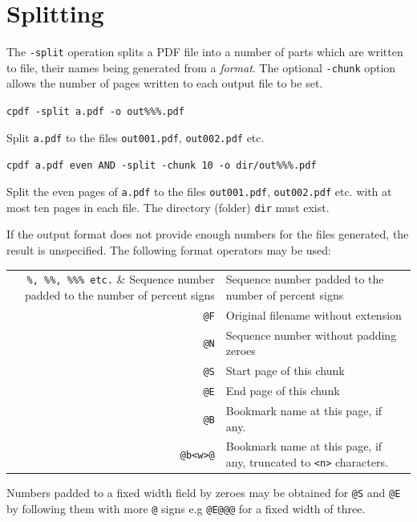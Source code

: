 \documentclass{book}
\begin{document}
  \section{Splitting}
   The \texttt{-split} operation splits a PDF file into a number of parts which
are written to file, their names being generated from a \emph{format}. The
optional \texttt{-chunk} option allows the number of pages written to each
output file to be set. 
  \begin{framed}\small
    \noindent\verb!cpdf -split a.pdf -o out%%%.pdf!

    \vspace{2.5mm}
    \noindent Split \texttt{a.pdf} to the files \texttt{out001.pdf}, \texttt{out002.pdf} etc.

    \vspace{2.5mm}
    \noindent\verb!cpdf a.pdf even AND -split -chunk 10 -o dir/out%%%.pdf!

    \vspace{2.5mm}
    \noindent Split the even pages of \texttt{a.pdf} to the files
\texttt{out001.pdf}, \texttt{out002.pdf} etc. with at most ten pages in each
file. The directory (folder) \texttt{dir} must exist.
  \end{framed}
\noindent If the output format does not provide enough numbers for the files generated,
the result is unspecified. The following format operators may be used:

\begin{center}
\begin{tabular}{rl}
  \verb!%, %%, %%% etc.! & Sequence number padded to the number of percent signs\\
  \texttt{@F} & Original filename without extension \\
  \texttt{@N} & Sequence number without padding zeroes \\
  \texttt{@S} & Start page of this chunk \\
  \texttt{@E} & End page of this chunk \\
  \texttt{@B} & Bookmark name at this page, if any. \\
  \texttt{@b<w>@} & Bookmark name at this page, if any, truncated to \texttt{<n>} characters.\\
\end{tabular}
\end{center}

\noindent Numbers padded to a fixed width field by zeroes may be obtained for \texttt{@S} and \texttt{@E} by following them with more \texttt{@} signs e.g \texttt{@E@@@} for a fixed width of three.
\end{document}
